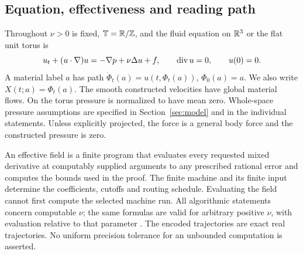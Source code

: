 \subsection{Equation, effectiveness and reading path}
Throughout $\nu>0$ is fixed, $\mathbb T=\mathbb R/\mathbb Z$, and the fluid equation on
$\mathbb R^3$ or the flat unit torus is
\begin{equation}\label{eq:box-NS}
 u_t+(u\cdot\nabla)u=-\nabla p+\nu\Delta u+f,
 \qquad \operatorname{div} u=0,\qquad u(0)=0.
\end{equation}
A material label $a$ has path $\dot\Phi_t(a)=u(t,\Phi_t(a))$,
$\Phi_0(a)=a$. We also write $X(t;a)=\Phi_t(a)$. The smooth constructed
velocities have global material flows. On the torus pressure is normalized
to have mean zero. Whole-space pressure assumptions are specified in
Section~\ref{sec:model} and in the individual statements. Unless explicitly
projected, the force is a general body force and the constructed pressure
is zero.

An effective field is a finite program that evaluates every requested
mixed derivative at computably supplied arguments to any prescribed
rational error and computes the bounds used in the proof. The finite
machine and its finite input determine the coefficients, cutoffs and
routing schedule. Evaluating the field cannot first compute the selected
machine run. All algorithmic statements concern computable $\nu$;
the same formulas are valid for arbitrary positive $\nu$, with evaluation
relative to that parameter \cite{PourElRichards1989,Weihrauch2000}. The encoded trajectories are exact real
trajectories. No uniform precision tolerance for an unbounded computation
is asserted.

